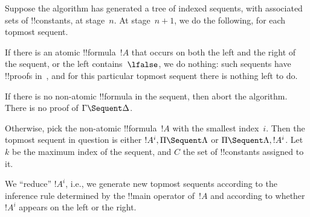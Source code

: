 \documentclass[../../../include/open-logic-section]{subfiles}
\begin{document}
Suppose the algorithm has generated a tree of indexed sequents, with
associated sets of !!{constant}s, at stage~$n$. At stage~$n+1$, we do
the following, for each topmost sequent. 

If there is an atomic !!{formula}~$!A$ that occurs on both the left and the
right of the sequent, or the left contains~$\lfalse$, we do nothing:
such sequents have !!{proof}s in~, and for this particular
topmost sequent there is nothing left to do.

If there is no non-atomic !!{formula} in the sequent, then abort the
algorithm. There is no proof of $\Gamma \Sequent \Delta$.

Otherwise, pick the non-atomic !!{formula}~$!A$ with the smallest
index~$i$. Then the topmost sequent in question is either $!A^i, \Pi
\Sequent \Lambda$ or $\Pi \Sequent \Lambda, !A^i$. Let $k$ be the
maximum index of the sequent, and $C$ the set of !!{constant}s
assigned to it.

We ``reduce'' $!A^i$, i.e., we generate new topmost sequents according
to the inference rule determined by the !!{main operator} of~$!A$
and according to whether $!A^i$ appears on the left or the right.
\end{document}
